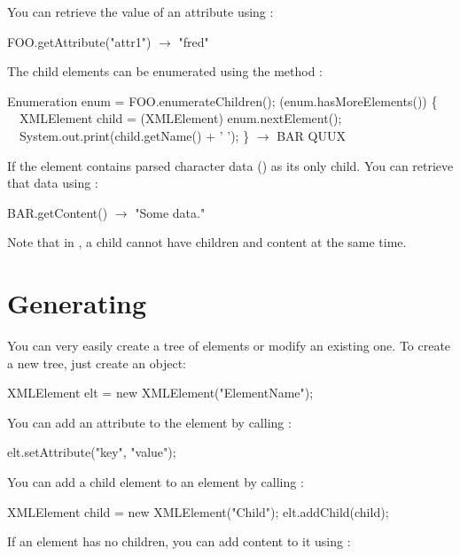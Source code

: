 You can retrieve the value of an attribute using :

\begin{example}
FOO.getAttribute("attr1") $\to$ "fred"
\end{example}

The child elements can be enumerated using the method
:

\begin{example}
Enumeration enum = FOO.enumerateChildren();
 (enum.hasMoreElements()) \{
~~XMLElement child = (XMLElement) enum.nextElement();
~~System.out.print(child.getName() + ' ');
\}
$\to$ BAR QUUX
\end{example}

If the element contains parsed character data () as its only
child.
You can retrieve that data using :

\begin{example}
BAR.getContent() $\to$ "Some data."
\end{example}

Note that in , a child cannot have children and
 content at the same time.

\section{Generating }

You can very easily create a tree of  elements or modify an existing
one.
To create a new tree, just create an  object:

\begin{example}
XMLElement elt = new XMLElement("ElementName");
\end{example}

You can add an attribute to the element by calling :

\begin{example}
elt.setAttribute("key", "value");
\end{example}

You can add a child element to an element by calling :

\begin{example}
XMLElement child = new XMLElement("Child");
elt.addChild(child);
\end{example}

If an element has no children, you can add  content to it using
:

